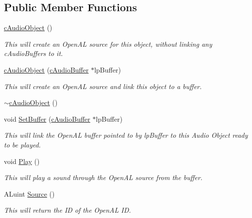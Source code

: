 \subsection*{Public Member Functions}
\begin{DoxyCompactItemize}
\item 
\hyperlink{classc_audio_object_a1a44ae87c2bf5e43aff66624a42771fe}{cAudioObject} ()
\begin{DoxyCompactList}\small\item\em This will create an OpenAL source for this object, without linking any cAudioBuffers to it. \item\end{DoxyCompactList}\item 
\hyperlink{classc_audio_object_a172d5d9e89376a0c505fa051e9d02919}{cAudioObject} (\hyperlink{classc_audio_buffer}{cAudioBuffer} $\ast$lpBuffer)
\begin{DoxyCompactList}\small\item\em This will create an OpenAL source and link this object to a buffer. \item\end{DoxyCompactList}\item 
\hyperlink{classc_audio_object_a57baf1e1384c3307ce8db629c9b2a59f}{$\sim$cAudioObject} ()
\item 
void \hyperlink{classc_audio_object_aaa2c81875452c51ecd3979a0b1b2c8b1}{SetBuffer} (\hyperlink{classc_audio_buffer}{cAudioBuffer} $\ast$lpBuffer)
\begin{DoxyCompactList}\small\item\em This will link the OpenAL buffer pointed to by lpBuffer to this Audio Object ready to be played. \item\end{DoxyCompactList}\item 
void \hyperlink{classc_audio_object_a2e7c8dc824eef10006f0f1c2824f10cd}{Play} ()
\begin{DoxyCompactList}\small\item\em This will play a sound through the OpenAL source from the buffer. \item\end{DoxyCompactList}\item 
ALuint \hyperlink{classc_audio_object_adb134027851226f2f5a446a3d885f26e}{Source} ()
\begin{DoxyCompactList}\small\item\em This will return the ID of the OpenAL ID. \item\end{DoxyCompactList}\end{DoxyCompactItemize}


